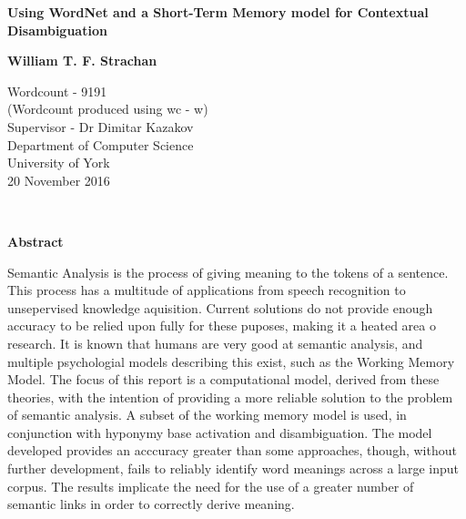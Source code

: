\documentclass[]{article}
\begin{document}
\begin{titlepage}
    \begin{center}
        \vspace*{1cm}
        
        \Huge
        \textbf{Using WordNet and a Short-Term Memory model for Contextual Disambiguation}
        \vspace{2cm}
        
        \Large
        \textbf{William T. F. Strachan}
        
        \vfill
                
        \vspace{0.8cm}
        
        \Large
        Wordcount - 9191\\
        (Wordcount produced using wc - w)\\
        Supervisor - Dr Dimitar Kazakov\\
        Department of Computer Science\\
        University of York\\
        20 November 2016
        
    \end{center}
\end{titlepage}
\
\vfill
\begin{center}
	\textbf{Abstract}
\end{center} 
\label{sec:Abstract}
Semantic Analysis is the process of giving meaning to the tokens of a sentence. This process has a multitude of applications from speech recognition to unsepervised knowledge aquisition. Current solutions do not provide enough accuracy to be relied upon fully for these puposes, making it a heated area o research. It is known that humans are very good at semantic analysis, and multiple psychologial models describing this exist, such as the Working Memory Model. The focus of this report is a computational model, derived from these theories, with the intention of providing a more reliable solution to the problem of semantic analysis. A subset of the working memory model is used, in conjunction with hyponymy base activation and disambiguation. The model developed provides an acccuracy greater than some approaches, though, without further development, fails to reliably identify word meanings across a large input corpus. The results implicate the need for the use of a greater number of semantic links in order to correctly derive meaning.

\vfill
\end{document}
